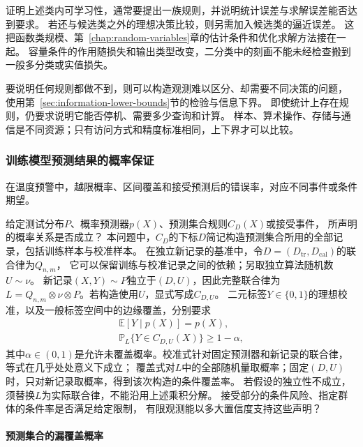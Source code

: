证明上述类内可学习性，通常要提出一族规则，并说明统计误差与求解误差能否达到要求。
若还与候选类之外的理想决策比较，则另需加入候选类的逼近误差。
这把函数类规模、第~\ref{chap:random-variables}章的估计条件和优化求解方法接在一起。
容量条件的作用随损失和输出类型改变，二分类中的刻画不能未经检查搬到一般多分类或实值损失。

要说明任何规则都做不到，则可以构造观测难以区分、却需要不同决策的问题，
使用第~\ref{sec:information-lower-bounds}节的检验与信息下界。
即使统计上存在规则，仍要求说明它能否停机、需要多少查询和计算。
样本、算术操作、存储与通信是不同资源；只有访问方式和精度标准相同，上下界才可以比较。

\subsubsection{训练模型预测结果的概率保证}
\label{sec:future-analysis-reliability}

在温度预警中，越限概率、区间覆盖和接受预测后的错误率，对应不同事件或条件期望。

\begin{mathproblem}[预测与决策的概率关系是否满足要求]
  \label{question:future-reliability}
  给定测试分布$P$、概率预测器$p(X)$、预测集合规则$C_D(X)$或接受事件，
  所声明的概率关系是否成立？
  本问题中，$C_D$的下标$D$简记构造预测集合所用的全部记录，包括训练样本与校准样本。
  在独立新记录的基准中，令$D=(D_{\mathrm{tr}},D_{\mathrm{cal}})$的联合律为$Q_{n,m}$，
  它可以保留训练与校准记录之间的依赖；另取独立算法随机数$U\sim\nu$。
  新记录$(X,Y)\sim P$独立于$(D,U)$，因此完整联合律为
  $L=Q_{n,m}\otimes\nu\otimes P$。若构造使用$U$，显式写成$C_{D,U}$。
  二元标签$Y\in\{0,1\}$的理想校准，以及一般标签空间中的边缘覆盖，分别要求
  \[
    \begin{gathered}
      \mathbb E[Y\mid p(X)]=p(X),\\
      \mathbb P_L\{Y\in C_{D,U}(X)\}\geq1-\alpha,
    \end{gathered}
  \]
  其中$\alpha\in(0,1)$是允许未覆盖概率。校准式针对固定预测器和新记录的联合律，等式在几乎处处意义下成立；
  覆盖式对$L$中的全部随机量取概率；固定$(D,U)$时，只对新记录取概率，得到该次构造的条件覆盖率。
  若假设的独立性不成立，须替换$L$为实际联合律，不能沿用上述乘积分解。
  接受部分的条件风险、指定群体的条件率是否满足给定限制，
  有限观测能以多大置信度支持这些声明？
\end{mathproblem}

\paragraph{预测集合的漏覆盖概率}

